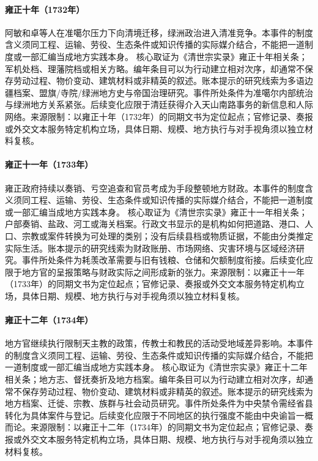 \hypertarget{civic:EQ-1732-AMIN-KHOJA-FLIGHT}{}\paragraph{雍正十年（1732年）}阿敏和卓等人在准噶尔压力下向清境迁移，绿洲政治进入清准竞争。本事件的制度含义须同工程、运输、劳役、生态条件或知识传播的实际媒介结合，不能把一道制度或一部汇编当成地方实践本身。 核心取证为《清世宗实录》雍正十年相关条；军机处档、理藩院档或相关方略。编年条目可以为行动建立相对次序，却通常不保存劳动过程、物价变动、建筑材料或非精英的叙述。账本提示的研究线索为多语边疆档案、盟旗/寺院/绿洲地方史与帝国治理研究。事件所处条件为准噶尔内部统治与绿洲地方关系紧张。后续变化应限于清廷获得介入天山南路事务的新信息和人际网络。来源限制：以雍正十年（1732年）的同期文书为定位起点；官修记录、奏报或外交文本服务特定机构立场，具体日期、规模、地方执行与对手视角须以独立材料复核。
\hypertarget{civic:EQ-1733-YONGZHENG-FISCAL-INSPECTION}{}\paragraph{雍正十一年（1733年）}雍正政府持续以奏销、亏空追查和官员考成为手段整顿地方财政。本事件的制度含义须同工程、运输、劳役、生态条件或知识传播的实际媒介结合，不能把一道制度或一部汇编当成地方实践本身。 核心取证为《清世宗实录》雍正十一年相关条；户部奏销、盐政、河工或海关档案。行政文书显示的是机构如何把道路、港口、人口、宗教或案件转换为可处理的类别；没有后续县档或物质证据，不能由分类推定实际生活。账本提示的研究线索为财政账册、市场网络、灾害环境与区域经济研究。事件所处条件为耗羡改革需要与旧有钱粮、仓储和欠额制度衔接。后续变化应限于地方官的呈报策略与财政实际之间形成新的张力。来源限制：以雍正十一年（1733年）的同期文书为定位起点；官修记录、奏报或外交文本服务特定机构立场，具体日期、规模、地方执行与对手视角须以独立材料复核。
\hypertarget{civic:EQ-1734-CHRISTIAN-ENFORCEMENT}{}\paragraph{雍正十二年（1734年）}地方官继续执行限制天主教的政策，传教士和教民的活动受地域差异影响。本事件的制度含义须同工程、运输、劳役、生态条件或知识传播的实际媒介结合，不能把一道制度或一部汇编当成地方实践本身。 核心取证为《清世宗实录》雍正十二年相关条；地方志、督抚奏折及地方档案。编年条目可以为行动建立相对次序，却通常不保存劳动过程、物价变动、建筑材料或非精英的叙述。账本提示的研究线索为地方档案、迁徙、宗教、族群与社会动员研究。事件所处条件为中央禁令需经省县转化为具体案件与登记。后续变化应限于不同地区的执行强度不能由中央谕旨一概而论。来源限制：以雍正十二年（1734年）的同期文书为定位起点；官修记录、奏报或外交文本服务特定机构立场，具体日期、规模、地方执行与对手视角须以独立材料复核。
